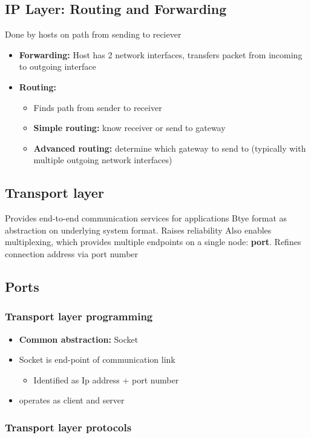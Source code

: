 \documentclass{report}
\begin{document}
     \subsection{IP Layer: Routing and Forwarding}
     \bigbreak \noindent 
     Done by hosts on path from sending to reciever
     \begin{itemize}
         \item \textbf{Forwarding:} Host has 2 network interfaces, transfers packet from incoming to outgoing interface
            \item \textbf{Routing:} 
                \begin{itemize}
                    \item Finds path from sender to receiver
                    \item \textbf{Simple routing:} know receiver or send to gateway
                    \item \textbf{Advanced routing:} determine which gateway to send to (typically with multiple outgoing network interfaces)
                \end{itemize}
     \end{itemize}

     \bigbreak \noindent 
     \subsection{Transport layer}
     \bigbreak \noindent 
     Provides end-to-end communication services for applications
     \bigbreak \noindent 
     Btye format as abstraction on underlying system format. Raises reliability
     \bigbreak \noindent 
     Also enables multiplexing, which provides multiple endpoints on a single node: \textbf{port}.
     \bigbreak \noindent 
     Refines connection address via port number
     \bigbreak \noindent 
     \subsection{Ports}
     \bigbreak \noindent 

     \bigbreak \noindent 
     \subsubsection{Transport layer programming}
     \bigbreak \noindent 
     \begin{itemize}
         \item \textbf{Common abstraction:} Socket
            \item Socket is end-point of communication link
                \begin{itemize}
                    \item Identified as Ip address + port number
                \end{itemize}
            \item operates as client and server
     \end{itemize}

     \bigbreak \noindent 
     \subsubsection{Transport layer protocols}
     \bigbreak \noindent 

    
\end{document}
